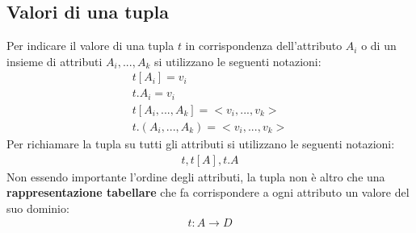 \subsection{Valori di una tupla}
Per indicare il valore di una tupla $t$ in corrispondenza dell'attributo $A_i$ o di un insieme di attributi $A_i, ..., A_k$ si utilizzano le seguenti notazioni:
    \begin{equation}\begin{aligned}
        t[A_i] = v_i\\
        t.A_i = v_i\\
        t[A_i, ..., A_k] = <v_i, ..., v_k>\\
        t.(A_i, ..., A_k) = <v_i, ..., v_k>
    \end{aligned}\end{equation}
Per richiamare la tupla su tutti gli attributi si utilizzano le seguenti notazioni:
    \begin{equation}\begin{aligned}
        t, t[A], t.A
    \end{aligned}\end{equation}
Non essendo importante l'ordine degli attributi, la tupla non è altro che una \textbf{rappresentazione tabellare} che fa corrispondere a ogni attributo un valore del suo dominio:
    \begin{equation}\begin{aligned}
        t: A \rightarrow D
    \end{aligned}\end{equation}
    
